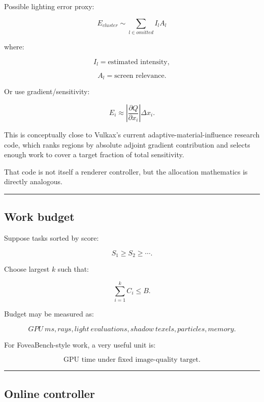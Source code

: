 Possible lighting error proxy:

\[
E_{cluster}
\sim
\sum_{l\in omitted}
I_l
A_l
\]

where:

\[
I_l=\text{estimated intensity},
\]

\[
A_l=\text{screen relevance}.
\]

Or use gradient/sensitivity:

\[
E_i
\approx
\left|
\frac{\partial Q}{\partial x_i}
\right|
\Delta x_i.
\]

This is conceptually close to Vulkax's current adaptive-material-influence research code, which ranks regions by absolute adjoint gradient contribution and selects enough work to cover a target fraction of total sensitivity.

That code is not itself a renderer controller, but the allocation mathematics is directly analogous.

\begin{center}\rule{0.5\linewidth}{0.5pt}\end{center}

\subsection{Work budget}\label{04-visual-computing-ii-ch040-work-budget}

\hypertarget{04-visual-computing-ii-ch040-work-budget}{}

Suppose tasks sorted by score:

\[
S_1\ge S_2\ge\cdots.
\]

Choose largest \(k\) such that:

\[
\boxed{
\sum_{i=1}^{k}C_i
\le B.
}
\]

Budget may be measured as:

\[
GPU\ ms,
rays,
light\ evaluations,
shadow\ texels,
particles,
memory.
\]

For FoveaBench-style work, a very useful unit is:

\[
\boxed{
\text{GPU time under fixed image-quality target}.
}
\]

\begin{center}\rule{0.5\linewidth}{0.5pt}\end{center}

\subsection{Online controller}\label{04-visual-computing-ii-ch040-online-controller}

